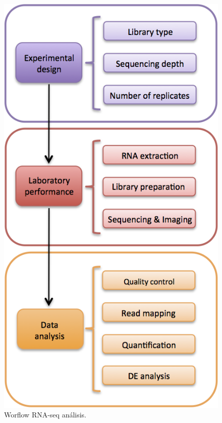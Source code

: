 \documentclass[]{article}
\begin{document}
\begin{figure}[H]

{\centering \includegraphics[width=6.65in,]{./figures/Workflow} 

}

\caption{Worflow RNA-seq análisis.}\label{fig:unnamed-chunk-1}
\end{figure}
\end{document}
